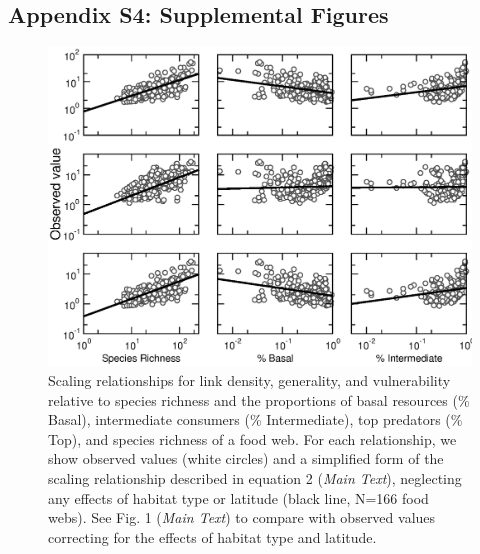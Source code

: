 \documentclass[12pt]{article}
\begin{document}

\newpage

\subsection*{Appendix S4: Supplemental Figures}

\begin{figure}[h]
\centerline{\includegraphics*[width=.75\textwidth]{Figures/by_TL/scaling_with_S/proportions/fitlines_nonts_observed.eps}}
\caption{Scaling relationships for link density, generality, 
and vulnerability relative to species richness and the proportions of basal resources (\% Basal),
intermediate consumers (\% Intermediate), top predators (\% Top), and species richness of a food web. 
For each relationship, we show observed values (white circles) and 
a simplified form of the scaling relationship described in equation 2 (\emph{Main Text}), neglecting 
any effects of habitat type or latitude (black line, N=166 food webs). See Fig. 1 (\emph{Main Text}) to compare with 
observed values correcting for the effects of habitat type and latitude. }
\label{props_v_lat_obs}
\end{figure}


\newpage
\end{document}
